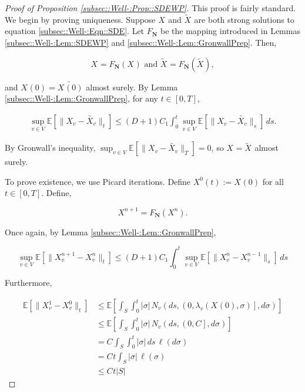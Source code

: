 \documentclass[12pt]{article}
\newcommand{\skipLine}{\vspace{12pt}}
\newcommand{\mb}{\mathbb}
\newcommand{\te}{\text}
\newcommand{\ex}[1]{\mb{E}\left[#1\right]}			%
\newcommand{\defeq}{:=}								%
\renewcommand{\v}{v}							%
\renewcommand{\S}{S}							%
\newcommand{\s}{\sigma}							%
\newcommand{\T}{T}								%
\renewcommand{\t}{t}							%
\renewcommand{\tt}{s}							%
\newcommand{\degr}{D}								%
\newcommand{\poiss}[1]{N_{#1}}						%
\newcommand{\poisses}{\mathbf{N}}				%
\newcommand{\V}{V}									%
\newcommand{\numb}{n}								%
\newcommand{\rxvt}[2]{X_{#1}{(#2)}}					%
\newcommand{\rxvtn}[3]{X_{#1}^{#3}(#2)}				%
\newcommand{\rxvts}[2]{X_{#1}{#2}}					%
\newcommand{\rxvtsn}[3]{X_{#1}^{#3}{#2}}			%
\newcommand{\rate}[1]{\lambda_{#1}}					%
\newcommand{\const}[1]{C_{#1}}						%
\newcommand{\Sm}{\ell}								%
\newcommand{\alt}{\widetilde}						%
\begin{document}
\begin{proof}[Proof of Proposition \ref{subsec::Well-:Prop::SDEWP}]

This proof is fairly standard. We begin by proving uniqueness. Suppose \(\rxvts{}{}\) and \(\alt{\rxvts{}{}}\) are both strong solutions to equation \ref{subsec::Well-:Eqn::SDE}. Let \(F_\poisses\) be the mapping introduced in Lemmas \ref{subsec::Well-:Lem::SDEWP} and \ref{subsec::Well-:Lem::GronwallPrep}. Then,

\[\rxvts{}{} = F_\poisses(\rxvts{}{})\te{ and } \alt{\rxvts{}{}} = F_\poisses(\alt{\rxvts{}{}}),\]

and \(\rxvt{}{0} = \alt{\rxvt{}{0}}\) almost surely. By Lemma \ref{subsec::Well-:Lem::GronwallPrep}, for any \(\t\in [0,\T]\),

\begin{align*}
\sup_{\v\in \V}\ex{\|\rxvts{\v}{} - \alt{\rxvts{\v}{}}\|_\t} \leq (\degr+1)\const{1}\int_0^\t\sup_{\v\in \V} \ex{\|\rxvts{\v}{} - \alt{\rxvts{\v}{}}\|_\tt}\,d\tt.
\end{align*}

By Gronwall's inequality, \(\sup_{\v \in \V} \ex{\|\rxvts{\v}{} - \alt{\rxvts{\v}{}}\|_\T} = 0\), so \(\rxvts{}{} = \alt{\rxvts{}{}}\) almost surely.

\skipLine

To prove existence, we use Picard iterations. Define \(\rxvtn{}{\t}{0} \defeq \rxvt{}{0}\) for all \(\t \in [0,\T]\). Define,

\[\rxvtsn{}{}{\numb+1} = F_\poisses(\rxvtsn{}{}{\numb}).\]

Once again, by Lemma \ref{subsec::Well-:Lem::GronwallPrep},

\[\sup_{\v \in \V} \ex{\|\rxvtsn{\v}{}{\numb+1} - \rxvtsn{\v}{}{\numb}\|_\t} \leq (\degr+1)\const{1} \int_0^\t \sup_{\v \in \V} \ex{\|\rxvtsn{\v}{}{\numb} - \rxvtsn{\v}{}{\numb-1}\|_\tt}\,d\tt\] 

Furthermore, 

\begin{align*}
\ex{\|\rxvtsn{\v}{}{1} - \rxvtsn{\v}{}{0}\|_\t} &\leq \ex{\int_\S\int_0^\t |\s|\,\poiss{\v}\left(d\tt,\left(0,\rate{\v}(\rxvt{}{0},\s)\right],d\s\right)}\\
&\leq \ex{\int_\S\int_0^\t |\s|\,\poiss{\v}\left(d\tt,\left(0,\const{}\right],d\s\right)}\\
&= \const{}\int_\S\int_0^\t |\s|\,d\tt\,\Sm(d\s)\\
&=\const{}\t\int_\S |\s|\,\Sm(\s)\\
&\leq \const{}\t|\S|
\end{align*}


\end{proof}
\end{document}
